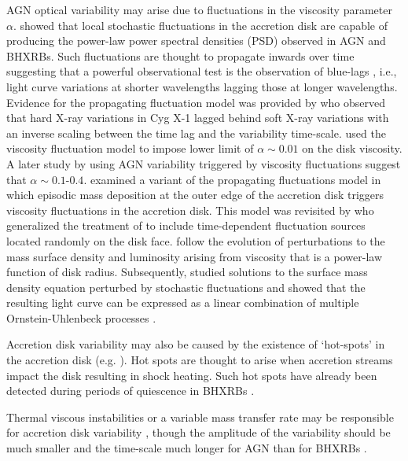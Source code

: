 \documentclass[a4paper,fleqn,usenatbib]{mnras}
\begin{document}
AGN optical variability may arise due to fluctuations in the \citet{ShakuraSunyaev73} viscosity parameter $\alpha$. \citet{Lyubarskii97} showed that local stochastic fluctuations in the accretion disk are capable of producing the power-law power spectral densities (PSD) observed in AGN and BHXRBs. Such fluctuations are thought to propagate inwards over time suggesting that a powerful observational test is the observation of blue-lags \citep{UttleyAccretion}, i.e., light curve variations at shorter wavelengths lagging those at longer wavelengths. Evidence for the propagating fluctuation model was provided by \citet{Miyamoto88} who observed that hard X-ray variations in Cyg X-1 lagged behind soft X-ray variations with an inverse scaling between the time lag and the variability time-scale. \citet{Starling04} used the viscosity fluctuation model to impose lower limit of $\alpha \sim 0.01$ on the disk viscosity. A later study by \citet{King07} using AGN variability triggered by viscosity fluctuations suggest that $\alpha \sim 0.1$-$0.4$. \citet{Wood01} examined a variant of the \citet{Lyubarskii97} propagating fluctuations model in which episodic mass deposition at the outer edge of the accretion disk triggers viscosity fluctuations in the accretion disk. This model was revisited by \citet{Titarchuk07} who generalized the treatment of \citet{Wood01} to include time-dependent fluctuation sources located randomly on the disk face. \citet{Titarchuk07} follow the evolution of perturbations to the mass surface density and luminosity arising from viscosity that is a power-law function of disk radius. Subsequently, \citet{Kelly11} studied solutions to the surface mass density equation perturbed by stochastic fluctuations and showed that the resulting light curve can be expressed as a linear combination of multiple Ornstein-Uhlenbeck processes \citep{Gillespie96,Kelly09}. 

Accretion disk variability may also be caused by the existence of `hot-spots' in the accretion disk (e.g. \citet{MaccaroneAccretion}). Hot spots are thought to arise when accretion streams impact the disk resulting in shock heating. Such hot spots have already been detected during periods of quiescence in BHXRBs \citep{Froning11,McClintock95}. 

Thermal viscous instabilities or a variable mass transfer rate may be responsible for accretion disk variability \citep{Lasota01,Coriat12}, though the amplitude of the variability should be much smaller and the time-scale much longer for AGN than for BHXRBs \citep{Hameury09}.
\end{document}
